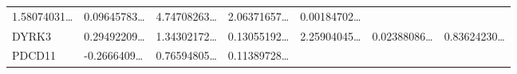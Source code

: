 \documentclass[
]{article}
\begin{document}
\begin{longtable}[]{@{}lllllll@{}}
\begin{minipage}[t]{0.12\columnwidth}
1.58074031\ldots{}\strut
\end{minipage} & \begin{minipage}[t]{0.12\columnwidth}\raggedright
0.09645783\ldots{}\strut
\end{minipage} & \begin{minipage}[t]{0.12\columnwidth}\raggedright
4.74708263\ldots{}\strut
\end{minipage} & \begin{minipage}[t]{0.12\columnwidth}\raggedright
2.06371657\ldots{}\strut
\end{minipage} & \begin{minipage}[t]{0.12\columnwidth}\raggedright
0.00184702\ldots{}\strut
\end{minipage}\tabularnewline
\begin{minipage}[t]{0.08\columnwidth}\raggedright
DYRK3\strut
\end{minipage} & \begin{minipage}[t]{0.12\columnwidth}\raggedright
0.29492209\ldots{}\strut
\end{minipage} & \begin{minipage}[t]{0.12\columnwidth}\raggedright
1.34302172\ldots{}\strut
\end{minipage} & \begin{minipage}[t]{0.12\columnwidth}\raggedright
0.13055192\ldots{}\strut
\end{minipage} & \begin{minipage}[t]{0.12\columnwidth}\raggedright
2.25904045\ldots{}\strut
\end{minipage} & \begin{minipage}[t]{0.12\columnwidth}\raggedright
0.02388086\ldots{}\strut
\end{minipage} & \begin{minipage}[t]{0.12\columnwidth}\raggedright
0.83624230\ldots{}\strut
\end{minipage}\tabularnewline
\begin{minipage}[t]{0.08\columnwidth}\raggedright
PDCD11\strut
\end{minipage} & \begin{minipage}[t]{0.12\columnwidth}\raggedright
-0.2666409\ldots{}\strut
\end{minipage} & \begin{minipage}[t]{0.12\columnwidth}\raggedright
0.76594805\ldots{}\strut
\end{minipage} & \begin{minipage}[t]{0.12\columnwidth}\raggedright
0.11389728\ldots{}\strut

\end{minipage}
\end{longtable}
\end{document}
